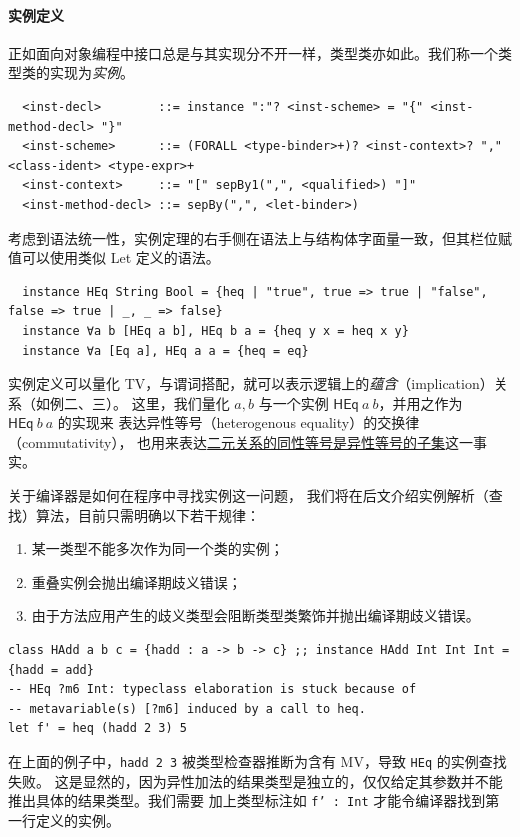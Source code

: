 \documentclass[a4paper, 11pt]{article}
\theoremstyle{remark}\newtheorem*{remark}{Remark}
\theoremstyle{definition}\newtheorem*{definition}{Definition}
\begin{document}
\paragraph{实例定义}
正如面向对象编程中接口总是与其实现分不开一样，类型类亦如此。我们称一个类型类的实现为\emph{实例}。
\begin{verbatim}
  <inst-decl>        ::= instance ":"? <inst-scheme> = "{" <inst-method-decl> "}"
  <inst-scheme>      ::= (FORALL <type-binder>+)? <inst-context>? "," <class-ident> <type-expr>+
  <inst-context>     ::= "[" sepBy1(",", <qualified>) "]"
  <inst-method-decl> ::= sepBy(",", <let-binder>)
\end{verbatim}
考虑到语法统一性，实例定理的右手侧在语法上与结构体字面量一致，但其栏位赋值可以使用类似
Let 定义的语法。
\begin{verbatim}
  instance HEq String Bool = {heq | "true", true => true | "false", false => true | _, _ => false}
  instance ∀a b [HEq a b], HEq b a = {heq y x = heq x y}
  instance ∀a [Eq a], HEq a a = {heq = eq}
\end{verbatim}
实例定义可以量化 TV，与谓词搭配，就可以表示逻辑上的\emph{蕴含}（implication）关系（如例二、三）。
这里，我们量化 $a, b$ 与一个实例 \(\mathsf{HEq}\ a\ b\)，并用之作为 $\mathsf{HEq}\ b\ a$ 的实现来
表达异性等号（heterogenous equality）的交换律（commutativity），
也用来表达\underline{二元关系的同性等号是异性等号的子集}这一事实。

关于编译器是如何在程序中寻找实例这一问题，
我们将在后文介绍实例解析（查找）算法，目前只需明确以下若干规律：
\begin{enumerate}\itemsep0em
  \item 某一类型不能多次作为同一个类的实例；
  \item 重叠实例会抛出编译期歧义错误；
  \item 由于方法应用产生的歧义类型会阻断类型类繁饰并抛出编译期歧义错误。
\end{enumerate}
\begin{verbatim}
class HAdd a b c = {hadd : a -> b -> c} ;; instance HAdd Int Int Int = {hadd = add}
-- HEq ?m6 Int: typeclass elaboration is stuck because of
-- metavariable(s) [?m6] induced by a call to heq.
let f' = heq (hadd 2 3) 5
\end{verbatim}
在上面的例子中，\texttt{hadd 2 3} 被类型检查器推断为含有 MV，导致 \texttt{HEq} 的实例查找失败。
这是显然的，因为异性加法的结果类型是独立的，仅仅给定其参数并不能推出具体的结果类型。我们需要
加上类型标注如 \texttt{f' : Int} 才能令编译器找到第一行定义的实例。
\end{document}
